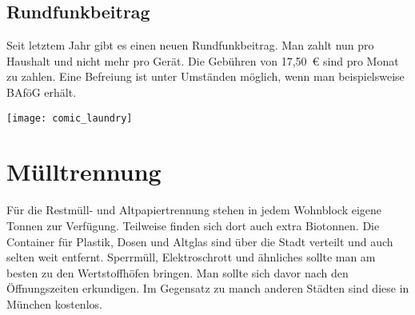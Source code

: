 \begin{multicols}{2}
\section{Rundfunkbeitrag}
Seit letztem Jahr gibt es einen neuen Rundfunkbeitrag. Man zahlt nun pro Haushalt und nicht mehr pro Gerät. Die Gebühren von 17,50~€ sind pro Monat zu zahlen. Eine Befreiung ist unter Umständen möglich, wenn man beispielsweise BAföG erhält.

\begin{urlList}
\end{urlList}

\columnbreak
\begin{center}
	\texttt{[image: comic\_laundry]}
\end{center}

\end{multicols}

\section{Mülltrennung}

Für die Restmüll- und Altpapiertrennung stehen in jedem Wohnblock eigene Tonnen zur Verfügung. Teilweise finden sich dort auch extra Biotonnen.
Die Container für Plastik, Dosen und Altglas sind über die Stadt verteilt und auch selten weit entfernt.
Sperrmüll, Elektroschrott und ähnliches sollte man am besten zu den Wertstoffhöfen bringen. Man sollte sich davor nach den Öffnungszeiten erkundigen. Im Gegensatz zu manch anderen Städten sind diese in München kostenlos.

\begin{urlList}
\end{urlList}

